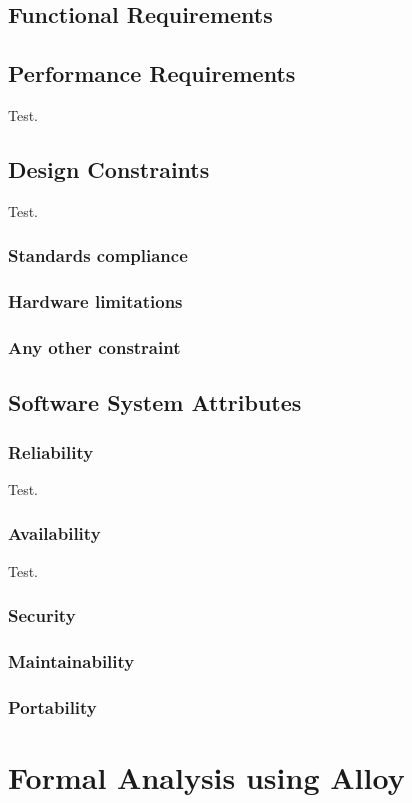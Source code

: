 \documentclass[table, 12pt]{article}
\begin{document}
\subsection{Functional Requirements}
\subsection{Performance Requirements}
Test.

\subsection{Design Constraints}
Test.

\subsubsection{Standards compliance}
\subsubsection{Hardware limitations}
\subsubsection{Any other constraint}

\subsection{Software System Attributes}
\subsubsection{Reliability}
Test.

\subsubsection{Availability}
Test.

\subsubsection{Security}
\subsubsection{Maintainability}
\subsubsection{Portability}

\section{Formal Analysis using Alloy}
\end{document}

